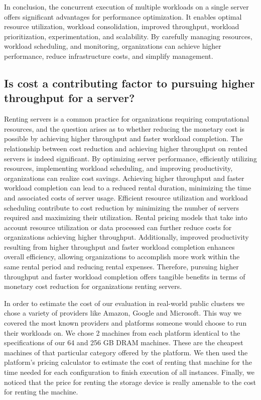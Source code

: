 In conclusion, the concurrent execution of multiple workloads on
a single server offers significant advantages for performance
optimization. It enables optimal resource utilization, workload
consolidation, improved throughput, workload prioritization,
experimentation, and scalability. By carefully managing resources,
workload scheduling, and monitoring, organizations can achieve higher
performance, reduce infrastructure costs, and simplify management.

\subsection{Is cost a contributing factor to pursuing higher
throughput for a server?}
Renting servers is a common practice for organizations requiring
computational resources, and the question arises as to whether
reducing the monetary cost is possible by achieving higher throughput
and faster workload completion. The relationship between cost
reduction and achieving higher throughput on rented servers is indeed
significant. By optimizing server performance, efficiently utilizing
resources, implementing workload scheduling, and improving
productivity, organizations can realize cost savings. Achieving higher
throughput and faster workload completion can lead to a reduced rental
duration, minimizing the time and associated costs of server usage.
Efficient resource utilization and workload scheduling contribute to
cost reduction by minimizing the number of servers required and
maximizing their utilization. Rental pricing models that take into
account resource utilization or data processed can further reduce
costs for organizations achieving higher throughput. Additionally,
improved productivity resulting from higher throughput and faster
workload completion enhances overall efficiency, allowing
organizations to accomplish more work within the same rental period
and reducing rental expenses. Therefore, pursuing higher throughput
and faster workload completion offers tangible benefits in terms of
monetary cost reduction for organizations renting servers. 
\par In order to estimate the cost of our evaluation in real-world public clusters we
chose a variety of providers like Amazon, Google and Microsoft. This
way we covered the most known providers and platforms someone would
choose to run their workloads on. We chose 2 machines from each
platform identical to the specifications of our 64 and 256 GB DRAM
machines. These are the cheapest machines of that particular category
offered by the platform. We then used the platform's pricing
calculator to estimate the cost of renting that machine for the time
needed for each configuration to finish execution of all instances. Finally, we noticed that the price for
renting the storage device is really amenable to the cost for renting the machine.

